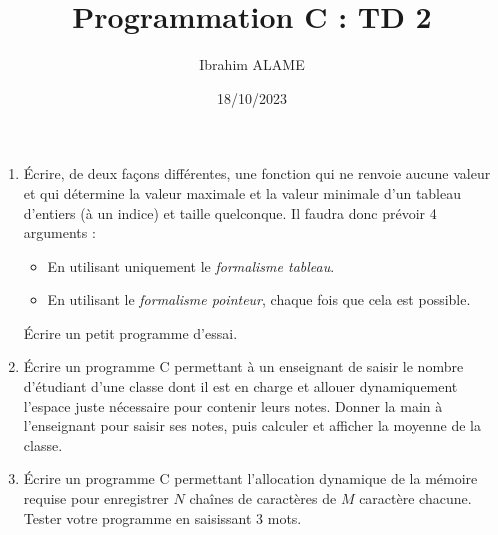 \documentclass[a4paper]{article}
\title{Programmation C : TD 2}
\author{Ibrahim ALAME}
\date{18/10/2023}
\begin{document}
\maketitle

\begin{enumerate}
\item Écrire, de deux façons différentes, une fonction qui ne renvoie aucune valeur et qui détermine
 la valeur maximale et la valeur minimale d'un tableau d'entiers (à un indice) et taille quelconque. 
 Il faudra donc prévoir 4 arguments :
 \begin{itemize}
 \item En utilisant uniquement le {\em formalisme tableau}.
 \item En utilisant  le {\em formalisme pointeur}, chaque fois que cela est possible.
 \end{itemize}
Écrire un petit programme d'essai.

\item Écrire un programme C permettant à un enseignant de saisir le nombre d'étudiant d'une classe dont il est en charge et allouer dynamiquement l'espace juste nécessaire pour contenir leurs notes. Donner la main à l'enseignant pour saisir ses notes, puis calculer et afficher la moyenne de la classe.
 
%
%

 \item  Écrire un programme C permettant l'allocation dynamique de la mémoire requise pour enregistrer $N$ chaînes de caractères de $M$ caractère chacune. Tester votre programme en saisissant 3 mots.
\end{enumerate}
\end{document}

